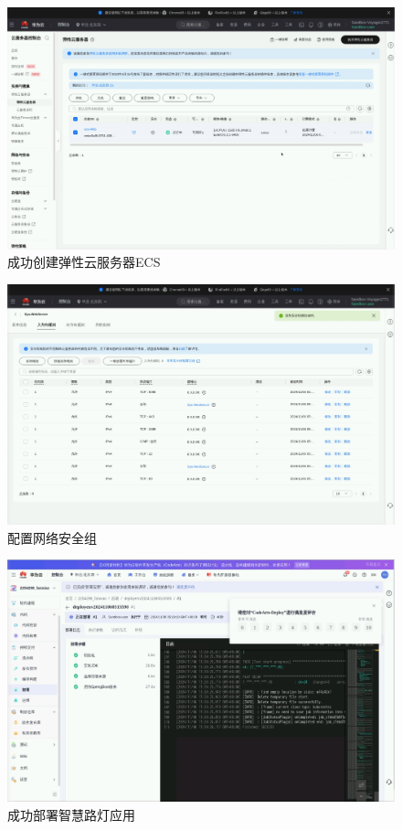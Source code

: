 \begin{figure}[!htbp]
\centering
\includegraphics[width=\textwidth]{figures/序列 01.00_05_06_39.Still005.png}
\caption{成功创建弹性云服务器ECS}\label{成功创建弹性云服务器ECS}
\end{figure}

\begin{figure}[!htbp]
\centering
\includegraphics[width=\textwidth]{figures/序列 01.00_05_44_31.Still006.png}
\caption{配置网络安全组}\label{配置网络安全组}
\end{figure}

\begin{figure}[!htbp]
\centering
\includegraphics[width=\textwidth]{figures/序列 01.00_11_19_34.Still007.png}
\caption{成功部署智慧路灯应用}\label{成功部署智慧路灯应用}
\end{figure}

